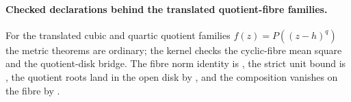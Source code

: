 \paragraph{Checked declarations behind the translated quotient-fibre families.}
For the translated cubic and quartic quotient families $f(z)=P((z-h)^q)$ the
metric theorems are ordinary; the kernel checks the cyclic-fibre mean square
and the quotient-disk bridge.  The fibre norm identity is
, the strict unit bound is
, the quotient roots land in the open disk by
, and the composition vanishes on the fibre by
.
